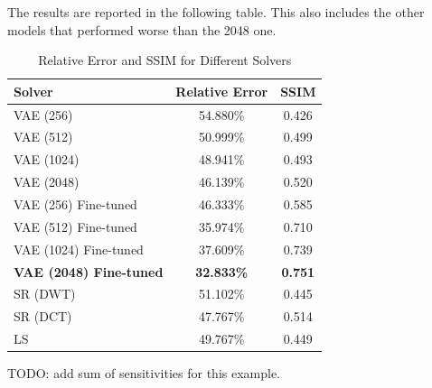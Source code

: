 The results are reported in the following table.
This also includes the other models that performed worse than the 2048 one.
\begin{table}[h]
    \centering
    \begin{tabular}{|l|c|c|}
        \hline
        \textbf{Solver} & \textbf{Relative Error} & \textbf{SSIM} \\
        \hline
        \hline
        VAE (256) & 54.880\% & 0.426 \\
        VAE (512) & 50.999\% & 0.499 \\
        VAE (1024) & 48.941\% & 0.493 \\
        VAE (2048) & 46.139\% & 0.520 \\
        \hline
        VAE (256) Fine-tuned & 46.333\% & 0.585 \\
        VAE (512) Fine-tuned & 35.974\% & 0.710 \\
        VAE (1024) Fine-tuned & 37.609\% & 0.739 \\
        \textbf{VAE (2048) Fine-tuned} & \textbf{32.833\%} & \textbf{0.751} \\
        \hline
        SR (DWT) & 51.102\% & 0.445 \\
        SR (DCT) & 47.767\% & 0.514 \\
        \hline
        LS & 49.767\% & 0.449 \\
        \hline
    \end{tabular}
    \caption{Relative Error and SSIM for Different Solvers}
    \label{tab:solvers}
\end{table}
TODO: add sum of sensitivities for this example.
